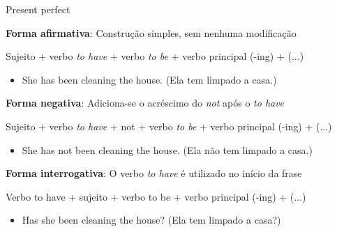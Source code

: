 \documentclass[compress,mathserif,xcolor=table]{beamer}
\begin{document}

\begin{frame}{Present perfect}

\textbf{Forma afirmativa}: Construção simples, sem nenhuma modificação

Sujeito + verbo \textit{to have} + verbo \textit{to be} + verbo principal (-ing) + (...)
\begin{itemize}
    \item She has been cleaning the house. (Ela tem limpado a casa.)
\end{itemize}

\vspace{0.25cm}

\textbf{Forma negativa}: Adiciona-se o acréscimo do \textit{not} após o \textit{to have}

Sujeito + verbo \textit{to have} + not + verbo \textit{to be} + verbo principal (-ing) + (...)
\begin{itemize}
    \item She has not been cleaning the house. (Ela não tem limpado a casa.)
\end{itemize}

\vspace{0.25cm}

\textbf{Forma interrogativa}: O verbo \textit{to have} é utilizado no início da frase

Verbo to have + sujeito + verbo to be + verbo principal (-ing) + (...)
\begin{itemize}
    \item Has she been cleaning the house? (Ela tem limpado a casa?)
\end{itemize}

\end{frame}
\end{document}
